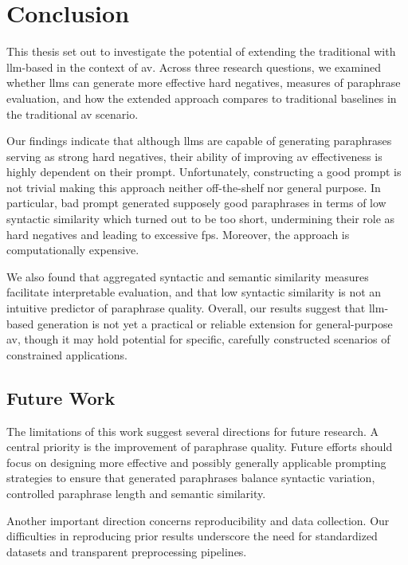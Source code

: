 \chapter{Conclusion}
\label{chap:conclusion}

This thesis set out to investigate the potential of extending the traditional \impAppr{} with \ac{llm}-based \imps{} in the context of \ac{av}. 
Across three research questions, we examined whether \acp{llm} can generate more effective hard negatives, measures of paraphrase evaluation, and how the extended approach compares to traditional baselines in the traditional \ac{av} scenario. 

Our findings indicate that although \acp{llm} are capable of generating paraphrases serving as strong hard negatives, their ability of improving \ac{av} effectiveness is highly dependent on their prompt.
Unfortunately, constructing a good prompt is not trivial making this approach neither off-the-shelf nor general purpose. 
In particular, bad prompt generated supposely good paraphrases in terms of low syntactic similarity which turned out to be too short, undermining their role as hard negatives and leading to excessive \acp{fp}. 
Moreover, the approach is computationally expensive. 

We also found that aggregated syntactic and semantic similarity measures facilitate interpretable evaluation, and that low syntactic similarity is not an intuitive predictor of paraphrase quality. 
Overall, our results suggest that \ac{llm}-based \imp{} generation is not yet a practical or reliable extension for general-purpose \ac{av}, though it may hold potential for specific, carefully constructed scenarios of constrained applications.


\section{Future Work}

The limitations of this work suggest several directions for future research. 
A central priority is the improvement of paraphrase quality. 
Future efforts should focus on designing more effective and possibly generally applicable prompting strategies to ensure that generated paraphrases balance syntactic variation, controlled paraphrase length and semantic similarity. 

Another important direction concerns reproducibility and data collection. 
Our difficulties in reproducing prior results underscore the need for standardized datasets and transparent preprocessing pipelines. 

